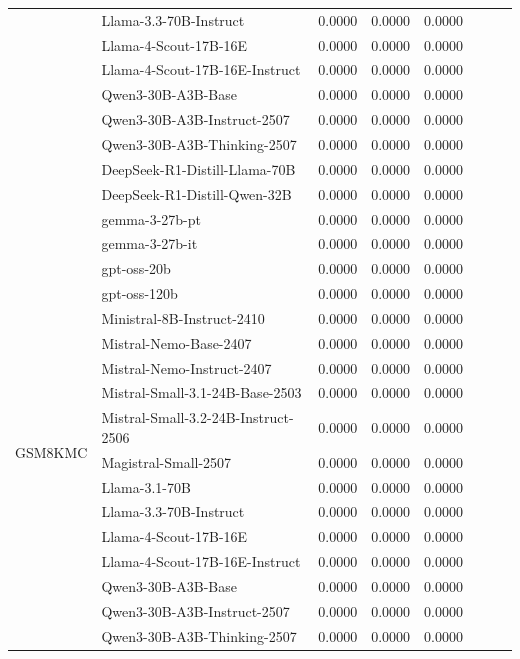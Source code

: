 \begin{table}[h]
{\begin{tabular}{l|lcccc|cc}
        & Llama-3.3-70B-Instruct & 0.0000 & 0.0000 & 0.0000 \\
        & Llama-4-Scout-17B-16E & 0.0000 & 0.0000 & 0.0000 \\
        & Llama-4-Scout-17B-16E-Instruct & 0.0000 & 0.0000 & 0.0000 \\
        & Qwen3-30B-A3B-Base & 0.0000 & 0.0000 & 0.0000 \\
        & Qwen3-30B-A3B-Instruct-2507 & 0.0000 & 0.0000 & 0.0000 \\
        & Qwen3-30B-A3B-Thinking-2507 & 0.0000 & 0.0000 & 0.0000 \\
        & DeepSeek-R1-Distill-Llama-70B & 0.0000 & 0.0000 & 0.0000 \\
        & DeepSeek-R1-Distill-Qwen-32B & 0.0000 & 0.0000 & 0.0000 \\
        & gemma-3-27b-pt & 0.0000 & 0.0000 & 0.0000 \\
        & gemma-3-27b-it & 0.0000 & 0.0000 & 0.0000 \\
        \midrule
        \multirow{19}{*}{GSM8KMC} & gpt-oss-20b & 0.0000 & 0.0000 & 0.0000 \\
        & gpt-oss-120b & 0.0000 & 0.0000 & 0.0000 \\
        & Ministral-8B-Instruct-2410 & 0.0000 & 0.0000 & 0.0000 \\
        & Mistral-Nemo-Base-2407 & 0.0000 & 0.0000 & 0.0000 \\
        & Mistral-Nemo-Instruct-2407 & 0.0000 & 0.0000 & 0.0000 \\
        & Mistral-Small-3.1-24B-Base-2503 & 0.0000 & 0.0000 & 0.0000 \\
        & Mistral-Small-3.2-24B-Instruct-2506 & 0.0000 & 0.0000 & 0.0000 \\
        & Magistral-Small-2507 & 0.0000 & 0.0000 & 0.0000 \\
        & Llama-3.1-70B & 0.0000 & 0.0000 & 0.0000 \\
        & Llama-3.3-70B-Instruct & 0.0000 & 0.0000 & 0.0000 \\
        & Llama-4-Scout-17B-16E & 0.0000 & 0.0000 & 0.0000 \\
        & Llama-4-Scout-17B-16E-Instruct & 0.0000 & 0.0000 & 0.0000 \\
        & Qwen3-30B-A3B-Base & 0.0000 & 0.0000 & 0.0000 \\
        & Qwen3-30B-A3B-Instruct-2507 & 0.0000 & 0.0000 & 0.0000 \\
        & Qwen3-30B-A3B-Thinking-2507 & 0.0000 & 0.0000 & 0.0000 \\

\end{tabular}}
\end{table}

